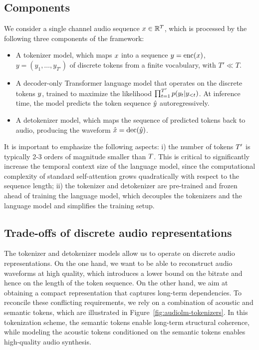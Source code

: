\documentclass[letterpaper,10 pt]{IEEEtran}
\begin{document}
\subsection{Components}
We consider a single channel audio sequence $x \in \mathbb{R}^{T}$, which is processed by the following three components of the \ours{} framework:
\begin{itemize}
    \item A tokenizer model, which maps $x$ into a sequence $y =\text{enc}(x)$, $y=(y_1,\dots,y_{T'})$ of discrete tokens from a finite vocabulary, with $T'\ll T$.
    
    \item A decoder-only Transformer language model that operates on the discrete tokens $y$, trained to maximize the likelihood $\prod_{t=1}^{T'}p(y_{t} | y_{<t})$. 
    At inference time, the model predicts the token sequence $\hat{y}$ autoregressively. 
    
    \item A detokenizer model, which maps the sequence of predicted tokens back to audio, producing the waveform $\hat{x} = \text{dec}(\hat{y})$.
\end{itemize}

It is important to emphasize the following aspects: i) the number of tokens $T'$ is typically 2-3 orders of magnitude smaller than $T$. This is critical to significantly increase the temporal context size of the language model, since the computational complexity of standard self-attention grows quadratically with respect to the sequence length; ii) the tokenizer and detokenizer are pre-trained and frozen ahead of training the language model, which decouples the tokenizers and the language model and simplifies the training setup.

\subsection{Trade-offs of discrete audio representations} \label{sec:tradeoffs}
The tokenizer and detokenizer models allow us to operate on discrete audio representations. On the one hand, we want to be able to reconstruct audio waveforms at high quality, which introduces a lower bound on the bitrate and hence on the length of the token sequence. On the other hand, we aim at obtaining a compact representation that captures long-term dependencies. To reconcile these conflicting requirements, we rely on a combination of acoustic and semantic tokens, which are illustrated in Figure~\ref{fig:audiolm-tokenizers}. In this tokenization scheme, the semantic tokens enable long-term structural coherence, while modeling the acoustic tokens conditioned on the semantic tokens enables high-quality audio synthesis.
\end{document}
